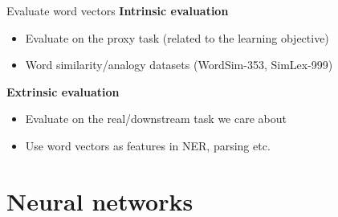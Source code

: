 \documentclass[usenames,dvipsnames,notes,11pt,aspectratio=169]{beamer}
\begin{document}


\begin{frame}
    {Evaluate word vectors}
    \textbf{Intrinsic evaluation}\\
    \begin{itemize}
        \item Evaluate on the proxy task (related to the learning objective)
        \item Word similarity/analogy datasets (\eg WordSim-353, SimLex-999)
    \end{itemize}

    \textbf{Extrinsic evaluation}\\
    \begin{itemize}
        \item Evaluate on the real/downstream task we care about
        \item Use word vectors as features in NER, parsing etc.
    \end{itemize}
\end{frame}

\section{Neural networks}
\end{document}
